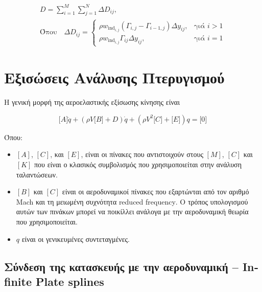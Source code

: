 \begin{multline}
D = \sum_{i = 1}^{M} \sum_{j = 1}^{N} \Delta D_{ij}, \\
\text{Όπου} \quad \Delta D_{ij} = \begin{cases}
    \rho w_{\text{ind}_{i,j}} \left( \Gamma_{i,j} - \Gamma_{i - 1,j} \right) \Delta y_{ij}, & \text{γιά } i > 1 \\
    \rho w_{\text{ind}_{i,j}} \Gamma_{ij} \Delta y_{ij}, & \text{γιά } i = 1
\end{cases}
\end{multline}


\section{Εξισώσεις Ανάλυσης Πτερυγισμού}\label{flutter-analysis-equations}

Η γενική μορφή της αεροελαστικής εξίσωσης κίνησης είναι \cite{AeroelasticityWright}

\begin{equation}
    \lbrack A\rbrack\ddot{q} + \left( \rho V\lbrack B\rbrack + D \right)\dot{q} + \left( \rho V^{2}\lbrack C\rbrack + \lbrack E\rbrack \right)q = \lbrack 0\rbrack  
\end{equation}



Όπου:

\begin{itemize}
  \item
    $[A]$, $[C]$, και $[E]$, είναι οι πίνακες που αντιστοιχούν στους $[M]$, $[C]$ και
    $[K]$ που είναι ο κλασικός συμβολισμός που χρησιμοποιείται στην ανάλυση ταλαντώσεων.
  \item
    $[B]$ και $[C]$ είναι οι αεροδυναμικοί πίνακες που εξαρτώνται από τον αριθμό \textlatin{Mach}
    και τη μειωμένη συχνότητα \textlatin{reduced frequency}. Ο τρόπος υπολογισμού αυτών των πινάκων μπορεί να
    ποικίλλει ανάλογα με την αεροδυναμική θεωρία που χρησιμοποιείται.
  \item
    $q$ είναι οι γενικευμένες συντεταγμένες.
  \end{itemize}
  
  


  \subsection{Σύνδεση της κατασκευής με την αεροδυναμική -- \textlatin{ Infinite Plate splines}}\label{interconnection-of-the-structure-with-aerodynamics-infinite-plate-splines}


